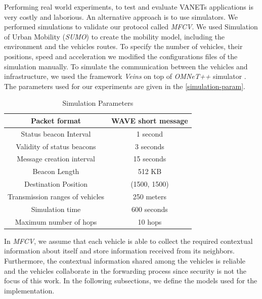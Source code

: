\documentclass[letterpaper, 10 pt, conference]{ieeeconf}  %
\begin{document}
Performing real world experiments, to test and evaluate VANETs applications is very costly and laborious. An alternative approach is to use simulators. We performed simulations to validate our protocol called \emph{MFCV}. We used Simulation of Urban Mobility (\emph{SUMO}) \cite{SUMO-2012} to create the mobility model, including the environment and the vehicles routes. To specify the number of vehicles, their positions, speed and acceleration we modified the configurations files of the simulation manually. To simulate the communication between the vehicles and infrastructure, we used the framework \emph{Veins} \cite{veins2016} on top of \emph{OMNeT++} simulator \cite{omnet2016}. The parameters used for our experiments are given in the \autoref{simulation-param}.

\begin{table}[ht]
    \center
    \caption{Simulation Parameters} \label{simulation-param}
    \begin{tabular}{|c|c|}
        \hline
        Packet format                  & WAVE short message \\ \hline
        Status beacon Interval         & 1 second           \\ \hline
        Validity of status beacons     & 3 seconds          \\ \hline
        Message creation interval      & 15 seconds         \\ \hline
        Beacon Length                  & 512 KB             \\ \hline
        Destination Position           & (1500, 1500)       \\ \hline
        Transmission ranges of vehicles & 250 meters         \\ \hline
        Simulation time                & 600 seconds        \\ \hline
        Maximum number of hops         & 10 hops            \\ \hline
    \end{tabular}
\end{table}

In \emph{MFCV}, we assume that each vehicle is able to collect the required contextual information about itself and store information received from its neighbors. Furthermore, the contextual information shared among the vehicles is reliable and the vehicles collaborate in the forwarding process since security is not the focus of this work. In the following subsections, we define the models used for the implementation.
\end{document}
